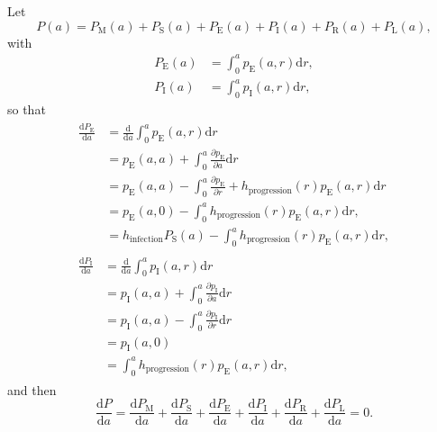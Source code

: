 \documentclass[12pt]{article}
\newcommand{\md}{\mathrm{d}}
\begin{document}
Let
\begin{equation}
  P(a) = P_{\mathrm{M}}(a) + P_{\mathrm{S}}(a)
  + P_{\mathrm{E}}(a) + P_{\mathrm{I}}(a)
  + P_{\mathrm{R}}(a) + P_{\mathrm{L}}(a),
\end{equation}
with
\begin{align}
  P_{\mathrm{E}}(a) &= \int_0^a p_{\mathrm{E}}(a, r) \md r,
  \\
  P_{\mathrm{I}}(a) &= \int_0^a p_{\mathrm{I}}(a, r) \md r,
\end{align}
so that
\begin{align}
  \begin{split}
    \frac{\md P_{\mathrm{E}}}{\md a}
    &= \frac{\md}{\md a}  \int_0^a p_{\mathrm{E}}(a, r) \md r
    \\
    &= p_{\mathrm{E}}(a, a)
    + \int_0^a \frac{\partial p_{\mathrm{E}}}{\partial a} \md r
    \\
    &= p_{\mathrm{E}}(a, a)
    - \int_0^a \frac{\partial p_{\mathrm{E}}}{\partial r}
    + h_{\mathrm{progression}}(r) p_{\mathrm{E}}(a, r) \md r
    \\
    &= p_{\mathrm{E}}(a, 0)
    - \int_0^a h_{\mathrm{progression}}(r) p_{\mathrm{E}}(a, r) \md r,
    \\
    &= h_{\mathrm{infection}} P_{\mathrm{S}}(a)
    - \int_0^a h_{\mathrm{progression}}(r) p_{\mathrm{E}}(a, r) \md r,
  \end{split}
  \\
  \begin{split}
    \frac{\md P_{\mathrm{I}}}{\md a}
    &= \frac{\md}{\md a}  \int_0^a p_{\mathrm{I}}(a, r) \md r
    \\
    &= p_{\mathrm{I}}(a, a)
    + \int_0^a \frac{\partial p_{\mathrm{I}}}{\partial a} \md r
    \\
    &= p_{\mathrm{I}}(a, a)
    - \int_0^a \frac{\partial p_{\mathrm{I}}}{\partial r} \md r
    \\
    &= p_{\mathrm{I}}(a, 0)
    \\
    &= \int_0^a h_{\mathrm{progression}}(r) p_{\mathrm{E}}(a, r) \md r,
  \end{split}
\end{align}
and then
\begin{equation}
  \frac{\md P}{\md a} =
  \frac{\md P_{\mathrm{M}}}{\md a}
  + \frac{\md P_{\mathrm{S}}}{\md a}
  + \frac{\md P_{\mathrm{E}}}{\md a}
  + \frac{\md P_{\mathrm{I}}}{\md a}
  + \frac{\md P_{\mathrm{R}}}{\md a}
  + \frac{\md P_{\mathrm{L}}}{\md a}
  = 0.
\end{equation}
\end{document}
